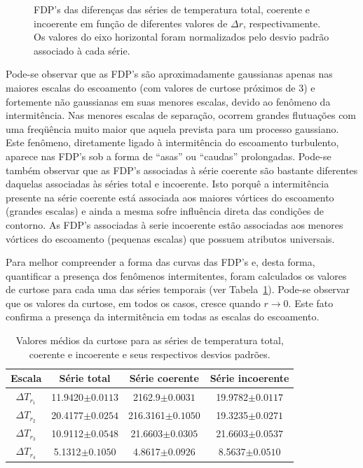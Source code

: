 \begin{figure}[ht]
\caption{FDP's das diferenças das séries de temperatura total, coerente e incoerente em função de diferentes valores de $\Delta r$, respectivamente. Os valores do eixo horizontal foram normalizados pelo desvio padrão associado à cada série.}
\label{figintermitente}
\end{figure}

Pode-se observar que as FDP's são aproximadamente gaussianas apenas nas maiores escalas do escoamento (com valores de curtose próximos de $3$) e fortemente não gaussianas em suas menores escalas, devido ao fenômeno da intermitência. Nas menores escalas de separação, ocorrem grandes flutuações com uma freqüência muito maior que aquela prevista para um processo gaussiano. Este fenômeno, diretamente ligado à intermitência do escoamento turbulento, aparece nas FDP's sob a forma de ``asas'' ou ``caudas'' prolongadas. Pode-se também observar que as FDP's associadas à série coerente são bastante diferentes daquelas associadas às séries total e incoerente. Isto porquê a intermitência presente na série coerente está associada aos maiores vórtices do escoamento (grandes escalas) e ainda a mesma sofre influência direta das condições de contorno. As FDP's associadas à serie incoerente estão associadas aos menores vórtices do escoamento (pequenas escalas) que possuem atributos universais.

Para melhor compreender a forma das curvas das FDP's e, desta forma, quantificar a presença dos fenômenos intermitentes, foram calculados os valores de curtose %
para cada uma das séries temporais (ver Tabela~\ref{tabcurtose}). Pode-se observar que os valores da curtose, em todos os casos, cresce quando $r\rightarrow 0$. Este fato confirma a presença da intermitência em todas as escalas do escoamento.


\begin{table}[!ht]
\begin{center}
\caption{Valores médios da curtose para as séries de temperatura total, coerente e incoerente e seus respectivos desvios padrões.}
\begin{tabular}{c c c c}
\hline 
\textbf{Escala} & \textbf{Série total} & \textbf{Série coerente} & \textbf{Série incoerente} \\
\hline
$\Delta T_{r_{1}}$ & 11.9420$\pm 0.0113$   & 2162.9$\pm 0.0031$   & 19.9782$\pm 0.0117$     \\
$\Delta T_{r_{2}}$ & 20.4177$\pm0.0254$  & 216.3161$\pm 0.1050$   & 19.3235$\pm 0.0271$    \\
$\Delta T_{r_{3}}$ & 10.9112$\pm0.0548$ & 21.6603$\pm 0.0305$     & 21.6603$\pm 0.0537$    \\
$\Delta T_{r_{4}}$ & 5.1312$\pm0.1050$ & 4.8617$\pm 0.0926$    &  8.5637$\pm 0.0510$    \\
\hline

\end{tabular}
\label{tabcurtose}
\end{center}
\end{table}


